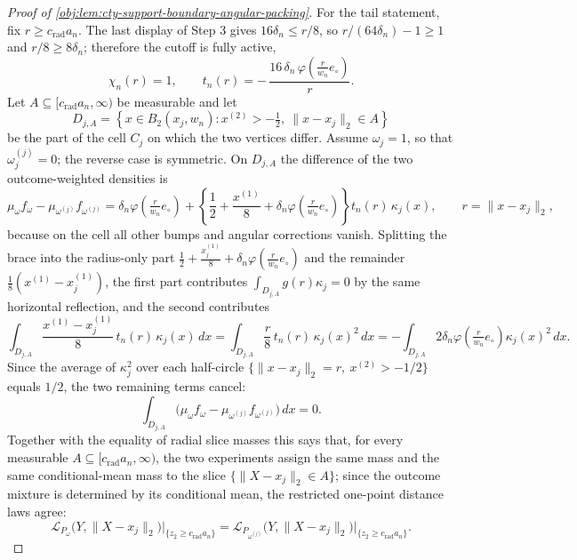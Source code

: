 \begin{proof}[Proof of \cref{obj:lem:cty-support-boundary-angular-packing}]
For the tail statement, fix \(r\ge c_{\mathrm{rad}}a_n\).  The last display of Step 3 gives \(16\delta_n\le r/8\), so \(r/(64\delta_n)-1\ge1\) and \(r/8\ge8\delta_n\); therefore the cutoff is fully active,
\[
\chi_n(r)=1,
\qquad
t_n(r)=-\,\frac{16\,\delta_n\,\varphi\!\left(\tfrac{r}{w_n}e_\circ\right)}{r} .
\]
Let \(A\subseteq[c_{\mathrm{rad}}a_n,\infty)\) be measurable and let
\[
D_{j,A}=\left\{x\in B_2(x_j,w_n):x^{(2)}>-\tfrac12,\ \lVert x-x_j\rVert_2\in A\right\}
\]
be the part of the cell \(C_j\) on which the two vertices differ.  Assume \(\omega_j=1\), so that \(\omega^{(j)}_j=0\); the reverse case is symmetric.  On \(D_{j,A}\) the difference of the two outcome-weighted densities is
\[
\mu_\omega f_\omega-\mu_{\omega^{(j)}}f_{\omega^{(j)}}
=
\delta_n\varphi\!\left(\tfrac{r}{w_n}e_\circ\right)
+
\left\{\frac12+\frac{x^{(1)}}{8}+\delta_n\varphi\!\left(\tfrac{r}{w_n}e_\circ\right)\right\}
t_n(r)\,\kappa_j(x),
\qquad r=\lVert x-x_j\rVert_2 ,
\]
because on the cell all other bumps and angular corrections vanish.
Splitting the brace into the radius-only part \(\tfrac12+\tfrac{x_j^{(1)}}{8}+\delta_n\varphi(\tfrac{r}{w_n}e_\circ)\) and the remainder \(\tfrac18(x^{(1)}-x_j^{(1)})\), the first part contributes \(\int_{D_{j,A}}g(r)\kappa_j=0\) by the same horizontal reflection, and the second contributes
\[
\int_{D_{j,A}}\frac{x^{(1)}-x_j^{(1)}}{8}\,t_n(r)\,\kappa_j(x)\,dx
=
\int_{D_{j,A}}\frac{r}{8}\,t_n(r)\,\kappa_j(x)^2\,dx
=
-\int_{D_{j,A}}2\delta_n\varphi\!\left(\tfrac{r}{w_n}e_\circ\right)\kappa_j(x)^2\,dx .
\]
Since the average of \(\kappa_j^2\) over each half-circle \(\{\lVert x-x_j\rVert_2=r,\ x^{(2)}>-1/2\}\) equals \(1/2\), the two remaining terms cancel:
\[
\int_{D_{j,A}}\bigl(\mu_\omega f_\omega-\mu_{\omega^{(j)}}f_{\omega^{(j)}}\bigr)\,dx=0 .
\]
Together with the equality of radial slice masses this says that, for every measurable \(A\subseteq[c_{\mathrm{rad}}a_n,\infty)\), the two experiments assign the same mass and the same conditional-mean mass to the slice \(\{\lVert X-x_j\rVert_2\in A\}\); since the outcome mixture is determined by its conditional mean, the restricted one-point distance laws agree:
\[
\mathcal L_{P_\omega}\bigl(Y,\lVert X-x_j\rVert_2\bigr)\Big|_{\{z_2\ge c_{\mathrm{rad}}a_n\}}
=
\mathcal L_{P_{\omega^{(j)}}}\bigl(Y,\lVert X-x_j\rVert_2\bigr)\Big|_{\{z_2\ge c_{\mathrm{rad}}a_n\}} .
\]


\end{proof}
